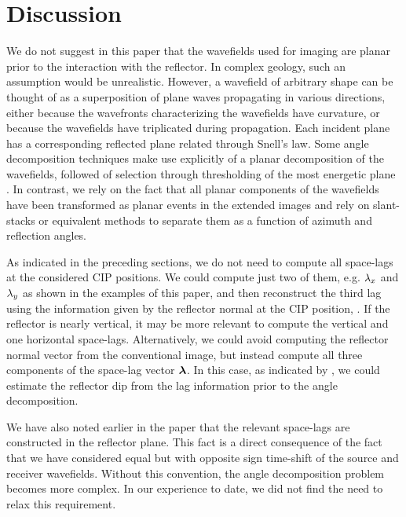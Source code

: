 \section{Discussion}


We do not suggest in this paper that the wavefields used for imaging
are planar prior to the interaction with the reflector. In complex
geology, such an assumption would be unrealistic. However, a wavefield
of arbitrary shape can be thought of as a superposition of plane waves
propagating in various directions, either because the wavefronts
characterizing the wavefields have curvature, or because the
wavefields have triplicated during propagation. Each incident plane
has a corresponding reflected plane related through Snell's law. Some
angle decomposition techniques make use explicitly of a planar
decomposition of the wavefields, followed of selection through
thresholding of the most energetic plane \cite[]{xu:3257}.  In
contrast, we rely on the fact that all planar components of the
wavefields have been transformed as planar events in the extended
images and rely on slant-stacks or equivalent methods to separate them
as a function of azimuth and reflection angles.


As indicated in the preceding sections, we do not need to compute all
space-lags at the considered CIP positions. We could compute just two
of them, e.g. ${\lambda_x}$ and ${\lambda_y}$ as shown in the examples of this paper,
and then reconstruct the third lag using the information given by the
reflector normal at the CIP position, . If the reflector
is nearly vertical, it may be more relevant to compute the vertical
and one horizontal space-lags.
%
Alternatively, we could avoid computing the reflector normal vector
from the conventional image, but instead compute all three components
of the space-lag vector ${\boldsymbol{\lambda}}$. In this case, as indicated by
\cite{SavaVasconcelos.gpr.eic}, we could estimate the reflector dip
from the lag information prior to the angle decomposition.

We have also noted earlier in the paper that the relevant space-lags
are constructed in the reflector plane. This fact is a direct
consequence of the fact that we have considered equal but with
opposite sign time-shift of the source and receiver
wavefields. Without this convention, the angle decomposition problem
becomes more complex. In our experience to date, we did not find the
need to relax this requirement. 

